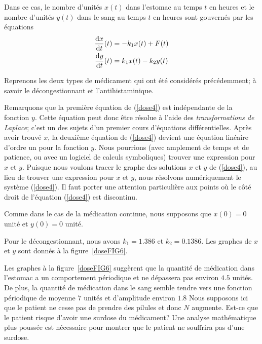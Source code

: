 {\begin{egg}

Dans ce cas, le nombre d'unités $x(t)$ dans l'estomac au temps $t$ en heures
et le nombre d'unités $y(t)$ dans le sang au temps $t$ en heures sont
gouvernés par les équations
\begin{equation} \label{dose4}
\begin{split}
\frac{\mathrm{d}x}{\mathrm{d}t}(t) &= -k_1 x(t) + F(t) \\
\frac{\mathrm{d}y}{\mathrm{d}t}(t) &= k_1 x(t) - k_2 y(t)
\end{split}
\end{equation}

Reprenons les deux types de médicament qui ont été considérés
précédemment; à savoir le décongestionnant et l'antihistaminique.

Remarquons que la première équation de (\ref{dose4}) est indépendante de la
fonction $y$.  Cette équation peut donc être résolue à l'aide des
{\em transformations de Laplace}; c'est un des sujets d'un premier
cours d'équations différentielles.  Après avoir trouvé $x$, la
deuxième équation de (\ref{dose4}) devient une équation linéaire
d'ordre un pour la fonction $y$.  Nous pourrions (avec amplement
de temps et de patience, ou avec un logiciel de calculs symboliques)
trouver une expression pour $x$ et $y$. Puisque nous voulons tracer le
graphe des solutions $x$ et $y$ de (\ref{dose4}), au lieu de trouver
une expression pour $x$ et $y$, nous résolvons numériquement le système
(\ref{dose4}).  Il faut porter une attention particulière aux points
où le côté droit de l'équation (\ref{dose4}) est discontinu.

Comme dans le cas de la médication continue, nous supposons que
$x(0)=0$ unité et $y(0)=0$ unité.

Pour le décongestionnant, nous avons $k_1=1.386$ et $k_2=0.1386$.  Les
graphes de $x$ et $y$ sont donnés à la figure~\ref{doseFIG6}.

Les graphes à la figure~\ref{doseFIG6} suggèrent que la quantité de
médication dans l'estomac a un comportement périodique et ne dépassera pas
environ $4.5$ unités.  De plus, la quantité de médication dans le sang semble
tendre vers une fonction périodique de moyenne $7$ unités et d'amplitude
environ $1.8$  Nous supposons ici que le patient ne cesse pas de prendre des
pilules et donc $N$ augmente.  Est-ce que le patient risque d'avoir une
surdose du médicament?  Une analyse mathématique plus poussée est
nécessaire pour montrer que le patient ne souffrira pas d'une surdose.


\end{egg}}
